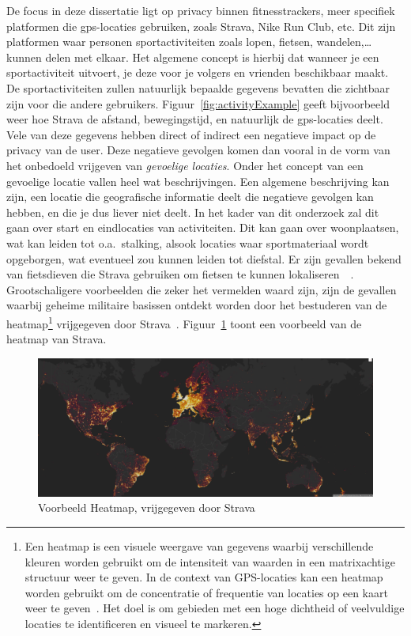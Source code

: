 De focus in deze dissertatie ligt op privacy binnen fitnesstrackers, meer
specifiek platformen die \ac{gps}-locaties gebruiken, zoals Strava, Nike Run
Club, etc. Dit zijn platformen waar personen sportactiviteiten zoals lopen,
fietsen, wandelen,\ldots kunnen delen met elkaar. Het algemene concept is
hierbij dat wanneer je een sportactiviteit uitvoert, je deze voor je volgers en
vrienden beschikbaar maakt. De sportactiviteiten zullen natuurlijk bepaalde
gegevens bevatten die zichtbaar zijn voor die andere gebruikers.
Figuur~\ref{fig:activityExample} geeft bijvoorbeeld weer hoe Strava de afstand,
bewegingstijd, en natuurlijk de \ac{gps}-locaties deelt. Vele van deze gegevens
hebben direct of indirect een negatieve impact op de privacy van de user. Deze
negatieve gevolgen komen dan vooral in de vorm van het onbedoeld vrijgeven van
\textit{gevoelige locaties}. Onder het concept van een gevoelige locatie vallen
heel wat beschrijvingen. Een algemene beschrijving kan zijn, een locatie die
geografische informatie deelt die negatieve gevolgen kan hebben, en die je dus
liever niet deelt. In het kader van dit onderzoek zal dit gaan over start en
eindlocaties van activiteiten. Dit kan gaan over woonplaatsen, wat kan leiden
tot o.a.\ stalking, alsook locaties waar sportmateriaal wordt opgeborgen, wat
eventueel zou kunnen leiden tot diefstal. Er zijn gevallen bekend van
fietsdieven die Strava gebruiken om fietsen te kunnen
lokaliseren~\cite{Sportapp72:online}~\cite{Cyclistw89:online}. Grootschaligere
voorbeelden die zeker het vermelden waard zijn, zijn de gevallen waarbij
geheime militaire basissen ontdekt worden door het bestuderen van de
heatmap\footnote{Een heatmap is een visuele weergave van gegevens waarbij
    verschillende kleuren worden gebruikt om de intensiteit van waarden in een
    matrixachtige structuur weer te geven. In de context van GPS-locaties kan een
    heatmap worden gebruikt om de concentratie of frequentie van locaties op een
    kaart weer te geven~\cite{Whatishe21:online}. Het doel is om gebieden met een
    hoge dichtheid of veelvuldige locaties te identificeren en visueel te
    markeren.} vrijgegeven door Strava~\cite{Fitnesst33:online}.
Figuur~\ref{fig:heatmap} toont een voorbeeld van de heatmap van Strava.
\begin{figure}
    \centering
    \includegraphics[width=\textwidth]{fig/Heatmap_strava.png}
    \caption{Voorbeeld Heatmap, vrijgegeven door Strava~\cite{StravaGl10:online}}\label{fig:heatmap}
\end{figure}

